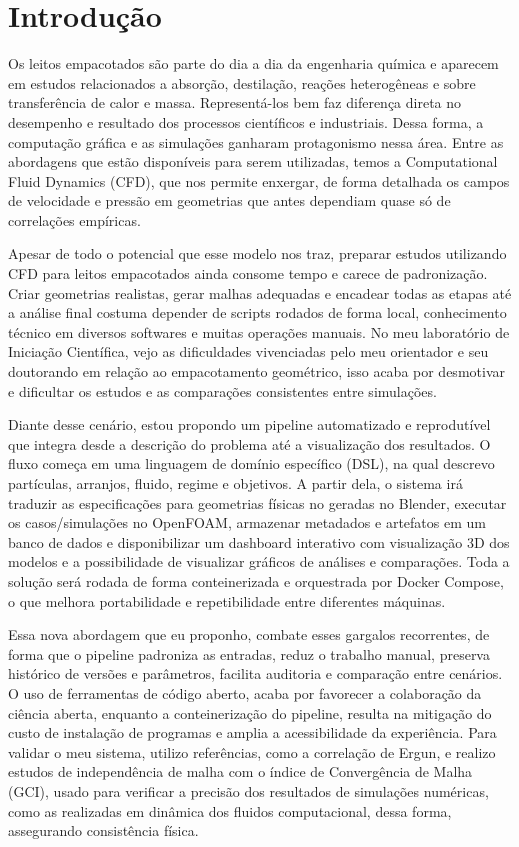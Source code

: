 \chapter{Introdução}
\label{cap:introducao}

Os leitos empacotados são parte do dia a dia da engenharia química e aparecem em estudos relacionados a absorção, destilação, reações heterogêneas e sobre transferência de calor e massa. Representá-los bem faz diferença direta no desempenho e resultado dos processos científicos e industriais. Dessa forma, a computação gráfica e as simulações ganharam protagonismo nessa área. Entre as abordagens que estão disponíveis para serem utilizadas, temos a Computational Fluid Dynamics (CFD), que nos permite enxergar, de forma detalhada os campos de velocidade e pressão em geometrias que antes dependiam quase só de correlações empíricas.

Apesar de todo o potencial que esse modelo nos traz, preparar estudos utilizando CFD para leitos empacotados ainda consome tempo e carece de padronização. Criar geometrias realistas, gerar malhas adequadas e encadear todas as etapas até a análise final costuma depender de scripts rodados de forma local, conhecimento técnico em diversos softwares e muitas operações manuais. No meu laboratório de Iniciação Científica, vejo as dificuldades vivenciadas pelo meu orientador e seu doutorando em relação ao empacotamento geométrico, isso acaba por desmotivar e dificultar os estudos e as comparações consistentes entre simulações.

Diante desse cenário, estou propondo um pipeline automatizado e reprodutível que integra desde a descrição do problema até a visualização dos resultados. O fluxo começa em uma linguagem de domínio específico (DSL), na qual descrevo partículas, arranjos, fluido, regime e objetivos. A partir dela, o sistema irá traduzir as especificações para geometrias físicas no geradas no Blender, executar os casos/simulações no OpenFOAM, armazenar metadados e artefatos em um banco de dados e disponibilizar um dashboard interativo com visualização 3D dos modelos e a possibilidade de visualizar gráficos de análises e comparações. Toda a solução será rodada de forma conteinerizada e orquestrada por Docker Compose, o que melhora portabilidade e repetibilidade entre diferentes máquinas.

Essa nova abordagem que eu proponho, combate esses gargalos recorrentes, de forma que o pipeline padroniza as entradas, reduz o trabalho manual, preserva histórico de versões e parâmetros, facilita auditoria e comparação entre cenários. O uso de ferramentas de código aberto, acaba por favorecer a colaboração da ciência aberta, enquanto a conteinerização do pipeline, resulta na mitigação do custo de instalação de programas e amplia a acessibilidade da experiência. Para validar o meu sistema, utilizo referências, como a correlação de Ergun, e realizo estudos de independência de malha com o índice de Convergência de Malha (GCI), usado para verificar a precisão dos resultados de simulações numéricas, como as realizadas em dinâmica dos fluidos computacional, dessa forma, assegurando consistência física.

